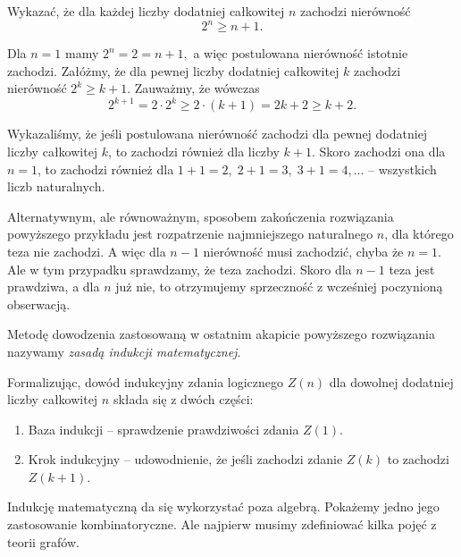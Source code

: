 


\noindent
Wykazać, że dla każdej liczby dodatniej całkowitej $n$ zachodzi nierówność
\[
	2^n \geqslant n + 1.
\]


\noindent
Dla $n = 1$ mamy $2^n = 2 = n + 1,$ a więc postulowana nierówność istotnie zachodzi.
Załóżmy, że dla pewnej liczby dodatniej całkowitej $k$ zachodzi nierówność ${2^k \geqslant k + 1}$. Zauważmy, że wówczas
\[
	2^{k + 1} = 2 \cdot 2^k \geqslant 2 \cdot (k + 1) = 2k + 2 \geqslant k + 2.
\]

Wykazaliśmy, że jeśli postulowana nierówność zachodzi dla pewnej dodatniej liczby całkowitej $k$, to zachodzi również dla liczby $k + 1$. Skoro zachodzi ona dla $n = 1$, to zachodzi również dla $1 + 1 = 2,\; 2 + 1 = 3,\; 3 + 1 = 4, ...$ -- wszystkich liczb naturalnych.

\vspace{20px}

\noindent
Alternatywnym, ale równoważnym, sposobem zakończenia rozwiązania powyższego przykładu jest rozpatrzenie najmniejszego naturalnego $n$, dla którego teza nie zachodzi. A więc dla $n - 1$ nierówność musi zachodzić, chyba że $n = 1$. Ale w tym przypadku sprawdzamy, że teza zachodzi. Skoro dla $n - 1$ teza jest prawdziwa, a dla $n$ już nie, to otrzymujemy sprzeczność z wcześniej poczynioną obserwacją.

\vspace{10px}

\noindent
Metodę dowodzenia zastosowaną w ostatnim akapicie powyższego rozwiązania nazywamy \textit{zasadą indukcji matematycznej}.


Formalizując, dowód indukcyjny zdania logicznego $Z(n)$ dla dowolnej dodatniej liczby całkowitej $n$ składa się z dwóch części:
\begin{enumerate}
	\item Baza indukcji -- sprawdzenie prawdziwości zdania $Z(1)$.
	\item Krok indukcyjny -- udowodnienie, że jeśli zachodzi zdanie $Z(k)$ to zachodzi $Z(k + 1)$.
\end{enumerate}


\noindent
Indukcję matematyczną da się wykorzystać poza algebrą. Pokażemy jedno jego zastosowanie kombinatoryczne. Ale najpierw musimy zdefiniować kilka pojęć z teorii grafów.

